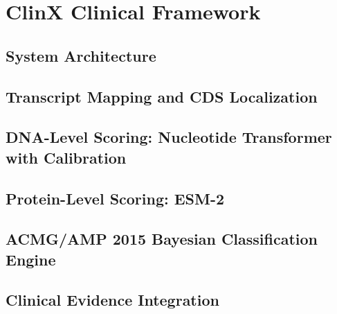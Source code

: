 \documentclass[10pt, conference, compsocconf]{IEEEtran}
\begin{document}
\section{ClinX Clinical Framework}
\label{sec:methodology}


\subsection{System Architecture}
\label{sec:architecture}

\subsection{Transcript Mapping and CDS Localization}
\label{sec:transcript}

\subsection{DNA-Level Scoring: Nucleotide Transformer with Calibration}
\label{sec:dna}

\subsection{Protein-Level Scoring: ESM-2}
\label{sec:protein}

\subsection{ACMG/AMP 2015 Bayesian Classification Engine}
\label{sec:acmg}

\subsection{Clinical Evidence Integration}
\label{sec:evidence}

\end{document}
